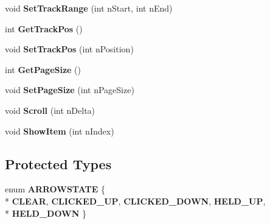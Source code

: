 \begin{DoxyCompactItemize}
\item 
\hypertarget{class_c_d_x_u_t_scroll_bar_ae8eb89fb79562550d1c481ba5f268522}{void {\bfseries Set\+Track\+Range} (int n\+Start, int n\+End)}\label{class_c_d_x_u_t_scroll_bar_ae8eb89fb79562550d1c481ba5f268522}

\item 
\hypertarget{class_c_d_x_u_t_scroll_bar_a96acaab90a5e33368ad8af53cb111e38}{int {\bfseries Get\+Track\+Pos} ()}\label{class_c_d_x_u_t_scroll_bar_a96acaab90a5e33368ad8af53cb111e38}

\item 
\hypertarget{class_c_d_x_u_t_scroll_bar_af38e14cfcc0d51d1c3238b3ed1d21553}{void {\bfseries Set\+Track\+Pos} (int n\+Position)}\label{class_c_d_x_u_t_scroll_bar_af38e14cfcc0d51d1c3238b3ed1d21553}

\item 
\hypertarget{class_c_d_x_u_t_scroll_bar_aa345a24d104acd194af1c637bb386fc3}{int {\bfseries Get\+Page\+Size} ()}\label{class_c_d_x_u_t_scroll_bar_aa345a24d104acd194af1c637bb386fc3}

\item 
\hypertarget{class_c_d_x_u_t_scroll_bar_ad59e8080c3af65a712c725d8cb4f1a10}{void {\bfseries Set\+Page\+Size} (int n\+Page\+Size)}\label{class_c_d_x_u_t_scroll_bar_ad59e8080c3af65a712c725d8cb4f1a10}

\item 
\hypertarget{class_c_d_x_u_t_scroll_bar_ae0f76bd7f88a7f26fce6b6026c686245}{void {\bfseries Scroll} (int n\+Delta)}\label{class_c_d_x_u_t_scroll_bar_ae0f76bd7f88a7f26fce6b6026c686245}

\item 
\hypertarget{class_c_d_x_u_t_scroll_bar_ae7cbe7407c725caf9f57ee95a3e633ca}{void {\bfseries Show\+Item} (int n\+Index)}\label{class_c_d_x_u_t_scroll_bar_ae7cbe7407c725caf9f57ee95a3e633ca}

\end{DoxyCompactItemize}
\subsection*{Protected Types}
\begin{DoxyCompactItemize}
\item 
\hypertarget{class_c_d_x_u_t_scroll_bar_a43b1ef354a17195db720617bf6b34595}{enum {\bfseries A\+R\+R\+O\+W\+S\+T\+A\+T\+E} \{ \\*
{\bfseries C\+L\+E\+A\+R}, 
{\bfseries C\+L\+I\+C\+K\+E\+D\+\_\+\+U\+P}, 
{\bfseries C\+L\+I\+C\+K\+E\+D\+\_\+\+D\+O\+W\+N}, 
{\bfseries H\+E\+L\+D\+\_\+\+U\+P}, 
\\*
{\bfseries H\+E\+L\+D\+\_\+\+D\+O\+W\+N}
 \}}\label{class_c_d_x_u_t_scroll_bar_a43b1ef354a17195db720617bf6b34595}

\end{DoxyCompactItemize}
